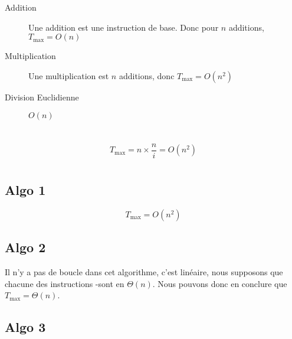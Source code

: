 \documentclass[a4paper, 11pt]{article}
\begin{document}
	\maketitle
	\section{}
\begin{description}
	\item[Addition] Une addition est une instruction de base. Donc pour $n$ additions,
		$T_{\max} = O(n)$
	\item[Multiplication] Une multiplication est $n$ additions, donc $T_{\max} = O(n^2)$ 
	\item[Division Euclidienne] $O(n)$
\end{description}
	\section{}
	\section{}
	$$T_{\max} = n \times \frac{n}{i} = O(n^2)$$
	\section{}
	\subsection{Algo 1}
	$$T_{\max} = O(n^2)$$
	\subsection{Algo 2}
		Il n'y a pas de boucle dans cet algorithme, c'est linéaire, nous supposons que chacune des instructions -sont en $\Theta(n)$. Nous
		pouvons donc en conclure que $T_{\max} = \Theta(n)$.
	\subsection{Algo 3}
	\section{}
\end{document}
